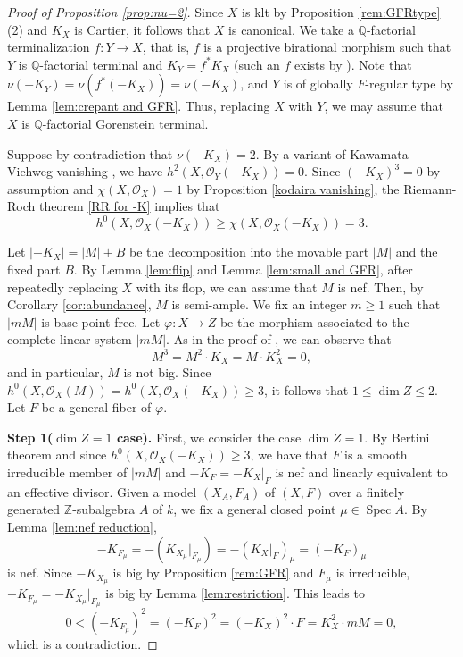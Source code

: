 \documentclass[12pt]{amsart}
\def\ge{\geqslant}
\def\phi{\varphi}
\def\Spec{\operatorname{Spec}}
\newcommand{\Q}{\mathbb{Q}}
\newcommand{\Z}{\mathbb{Z}}
\newcommand{\sO}{\mathcal{O}}
\theoremstyle{plain}
\theoremstyle{definition}
\theoremstyle{remark}
\newtheorem{defn and notation}[thm]{Definition and Notation}
\theoremstyle{plain}
\begin{document}
\begin{proof}[Proof of Proposition \ref{prop:nu=2}]
    Since $X$ is klt by Proposition \ref{rem:GFRtype} (2) and $K_X$ is Cartier, it follows that $X$ is canonical.
    We take a $\Q$-factorial terminalization $f\colon Y\to X$, that is, $f$ is a projective birational morphism such that $Y$ is $\Q$-factorial terminal and $K_Y=f^{*}K_X$ (such an $f$ exists by \cite[P.~360, Theorem (b)]{Reid(Young)}).
    Note that  $\nu(-K_Y)=\nu(f^{*}(-K_X))=\nu(-K_X)$, %
    and $Y$ is of globally $F$-regular type by Lemma \ref{lem:crepant and GFR}. Thus, replacing $X$ with $Y$, we may assume that $X$ is $\Q$-factorial Gorenstein terminal.

    
    Suppose by contradiction that $\nu(-K_X)=2$.    
    By a variant of Kawamata-Viehweg vanishing \cite[Lemma 2.1]{Lazic-Peternell17}, we have $h^2(X, \sO_Y(-K_X))=0$.
    Since $(-K_X)^3=0$ by assumption and $\chi(X,\sO_X)=1$ by Proposition \ref{kodaira vanishing}, 
    the Riemann-Roch theorem \eqref{RR for -K} implies that
    \[
    h^0(X, \sO_X(-K_X))\geq \chi(X, \sO_X(-K_X))=3.
    \]
    
    Let $|-K_X|=|M|+B$ be the decomposition into the movable part $|M|$ and the fixed part $B$.
    By Lemma \ref{lem:flip} and Lemma \ref{lem:small and GFR}, after repeatedly replacing $X$ with its flop, we can assume that $M$ is nef.
    Then, by Corollary \ref{cor:abundance}, $M$ is semi-ample. 
    We fix an integer $m \ge 1$ such that $|mM|$ is base point free.
    Let $\phi\colon X\to Z$ be the morphism associated to the complete linear system $|mM|$. 
    As in the proof of \cite[Lemma 4.2]{Xie20}, we can observe that 
    \[M^3=M^2\cdot K_X=M\cdot K_X^2=0,\] and in particular, $M$ is not big.
    Since $h^0(X,\sO_X(M))=h^0(X, \sO_X(-K_X))\geq 3$, it follows that $1\leq \dim Z\leq 2$.
    Let $F$ be a general fiber of $\phi$. 

    \textbf{Step 1($\dim Z=1$ case).}
    First, we consider the case $\dim Z=1$.
    By Bertini theorem and since $h^0(X, \sO_X(-K_X))\geq 3$, we have that $F$ is a smooth irreducible member of $|mM|$ and $-K_{F}=-K_{X}|_{F}$ is nef and linearly equivalent to an effective divisor.
    Given a model $(X_A, F_A)$ of $(X, F)$ over a finitely generated $\Z$-subalgebra $A$ of $k$, we fix a general closed point $\mu \in \Spec A$.  
    By Lemma \ref{lem:nef reduction}, 
    \[-K_{F_{\mu}}=-(K_{X_{\mu}}|_{F_{\mu}})= -(K_{X}|_{F})_{\mu}=(-K_{F})_{\mu}\] 
    is nef.
    Since  
    $-K_{X_{\mu}}$ is big by Proposition \ref{rem:GFR} and 
    $F_{\mu}$ is irreducible, 
    $-K_{F_{\mu}}=-K_{X_{\mu}}|_{F_{\mu}}$ is big by Lemma \ref{lem:restriction}.
    This leads to  
    \[
    0<(-K_{F_{\mu}})^2=(-K_F)^2=(-K_X)^2\cdot F=K_X^2 \cdot mM=0,
    \]
    which is a contradiction.


\end{proof}
\end{document}
